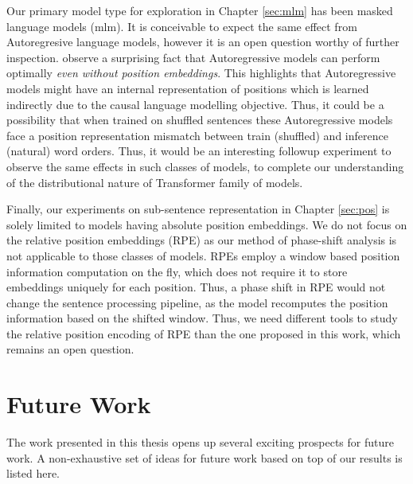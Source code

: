 \documentclass[letterpaper, 12pt]{report}
\begin{document}
Our primary model type for exploration in Chapter \autoref{sec:mlm} has been masked language models (\acrshort{mlm}). It is conceivable to expect the same effect from Autoregresive language models, however it is an open question worthy of further inspection. \citet{haviv2022} observe a surprising fact that Autoregressive models can perform optimally \textit{even without position embeddings}. This highlights that Autoregressive models might have an internal representation of positions which is learned indirectly due to the causal language modelling objective. Thus, it could be a possibility that when trained on shuffled sentences these Autoregressive models face a position representation mismatch between train (shuffled) and inference (natural) word orders. Thus, it would be an interesting followup experiment to observe the same effects in such classes of models, to complete our understanding of the distributional nature of Transformer family of models.

Finally, our experiments on sub-sentence representation in Chapter \autoref{sec:pos} is solely limited to models having absolute position embeddings. We do not focus on the relative position embeddings \citep{shaw-etal-2018-self, Raffel2020:T5} (RPE) as our method of phase-shift analysis is not applicable to those classes of models. RPEs employ a window based position information computation on the fly, which does not require it to store embeddings uniquely for each position. Thus, a phase shift in RPE would not change the sentence processing pipeline, as the model recomputes the position information based on the shifted window. Thus, we need different tools to study the relative position encoding of RPE than the one proposed in this work, which remains an open question.

\section{Future Work}
\label{sec:conc_future}

The work presented in this thesis opens up several exciting prospects for future work. A non-exhaustive set of ideas for future work based on top of our results is listed here.
\end{document}
